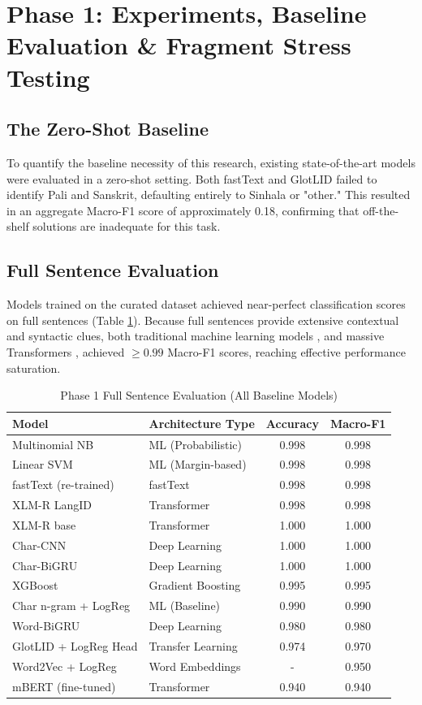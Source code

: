 \documentclass[conference]{IEEEtran}
\begin{document}
\section{Phase 1: Experiments, Baseline Evaluation \& Fragment Stress Testing}

\subsection{The Zero-Shot Baseline}
To quantify the baseline necessity of this research, existing state-of-the-art models were evaluated in a zero-shot setting. Both fastText \cite{b1} and GlotLID \cite{b4} failed to identify Pali and Sanskrit, defaulting entirely to Sinhala or "other." This resulted in an aggregate Macro-F1 score of approximately 0.18, confirming that off-the-shelf solutions are inadequate for this task.

\subsection{Full Sentence Evaluation}
Models trained on the curated dataset achieved near-perfect classification scores on full sentences (Table \ref{tab:fullsent}). Because full sentences provide extensive contextual and syntactic clues, both traditional machine learning models \cite{b9}, \cite{b10} and massive Transformers \cite{b2}, \cite{b5} achieved $\ge 0.99$ Macro-F1 scores, reaching effective performance saturation. 

\begin{table}[htbp]
\caption{Phase 1 Full Sentence Evaluation (All Baseline Models)}
\begin{center}
\begin{tabular}{llcc}
\toprule
\textbf{Model} & \textbf{Architecture Type} & \textbf{Accuracy} & \textbf{Macro-F1} \\
\midrule
Multinomial NB & ML (Probabilistic) & 0.998 & 0.998 \\
Linear SVM & ML (Margin-based) & 0.998 & 0.998 \\
fastText (re-trained) & fastText & 0.998 & 0.998 \\
XLM-R LangID & Transformer & 0.998 & 0.998 \\
XLM-R base & Transformer & 1.000 & 1.000 \\
Char-CNN & Deep Learning & 1.000 & 1.000 \\
Char-BiGRU & Deep Learning & 1.000 & 1.000 \\
XGBoost & Gradient Boosting & 0.995 & 0.995 \\
Char n-gram + LogReg & ML (Baseline) & 0.990 & 0.990 \\
Word-BiGRU & Deep Learning & 0.980 & 0.980 \\
GlotLID + LogReg Head & Transfer Learning & 0.974 & 0.970 \\
Word2Vec + LogReg & Word Embeddings & - & 0.950 \\
mBERT (fine-tuned) & Transformer & 0.940 & 0.940 \\
\bottomrule
\end{tabular}
\label{tab:fullsent}
\end{center}
\end{table}
\end{document}
